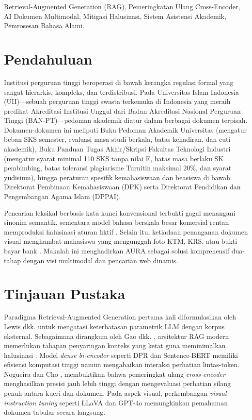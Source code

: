 \documentclass[conference]{IEEEtran}
\begin{document}
\begin{IEEEkeywords}
Retrieval-Augmented Generation (RAG), Pemeringkatan Ulang Cross-Encoder, AI Dokumen Multimodal, Mitigasi Halusinasi, Sistem Asistensi Akademik, Pemrosesan Bahasa Alami.
\end{IEEEkeywords}

\section{Pendahuluan}
Institusi perguruan tinggi beroperasi di bawah kerangka regulasi formal yang sangat hierarkis, kompleks, dan terdistribusi. Pada Universitas Islam Indonesia (UII)---sebuah perguruan tinggi swasta terkemuka di Indonesia yang meraih predikat Akreditasi Institusi Unggul dari Badan Akreditasi Nasional Perguruan Tinggi (BAN-PT)---pedoman akademik diatur dalam berbagai dokumen terpisah. Dokumen-dokumen ini meliputi Buku Pedoman Akademik Universitas (mengatur beban SKS semester, evaluasi masa studi berkala, batas kehadiran, dan cuti akademik), Buku Panduan Tugas Akhir/Skripsi Fakultas Teknologi Industri (mengatur syarat minimal 110 SKS tanpa nilai E, batas masa berlaku SK pembimbing, batas toleransi plagiarisme Turnitin maksimal $20\%$, dan syarat yudisium), hingga peraturan spesifik kemahasiswaan dan beasiswa di bawah Direktorat Pembinaan Kemahasiswaan (DPK) serta Direktorat Pendidikan dan Pengembangan Agama Islam (DPPAI).

Pencarian leksikal berbasis kata kunci konvensional terbukti gagal menangani sinonim semantik, sementara model bahasa berskala besar komersial rentan memproduksi halusinasi aturan fiktif \cite{ji2023survey}. Selain itu, ketiadaan penanganan dokumen visual menghambat mahasiswa yang mengunggah foto KTM, KRS, atau bukti bayar bank \cite{barnett2024seven}. Makalah ini menghadirkan AURA sebagai solusi komprehensif dua-tahap dengan visi multimodal dan pencarian web dinamis.

\section{Tinjauan Pustaka}
Paradigma Retrieval-Augmented Generation pertama kali diformulasikan oleh Lewis dkk. \cite{lewis2020retrieval} untuk mengatasi keterbatasan parametrik LLM dengan korpus eksternal. Sebagaimana dirangkum oleh Gao dkk. \cite{gao2023retrieval}, arsitektur RAG modern memerlukan tahapan penyaringan konteks yang ketat guna meminimalkan halusinasi \cite{zhang2023siren}. Model \textit{dense bi-encoder} seperti DPR \cite{karpukhin2020dense} dan Sentence-BERT \cite{reimers2019sentence} memiliki efisiensi komputasi tinggi namun mengabaikan interaksi perhatian lintas-token. Nogueira dan Cho \cite{nogueira2019passage}, \cite{nogueira2020document} membuktikan bahwa pemeringkat ulang \textit{cross-encoder} menghasilkan presisi jauh lebih tinggi dengan mengevaluasi perhatian silang penuh antara kueri dan dokumen. Pada aspek visual, perkembangan \textit{visual instruction tuning} seperti LLaVA \cite{liu2023visual} dan GPT-4o \cite{openai2024gpt4o} memungkinkan pemahaman dokumen tabular secara langsung.
\end{document}
